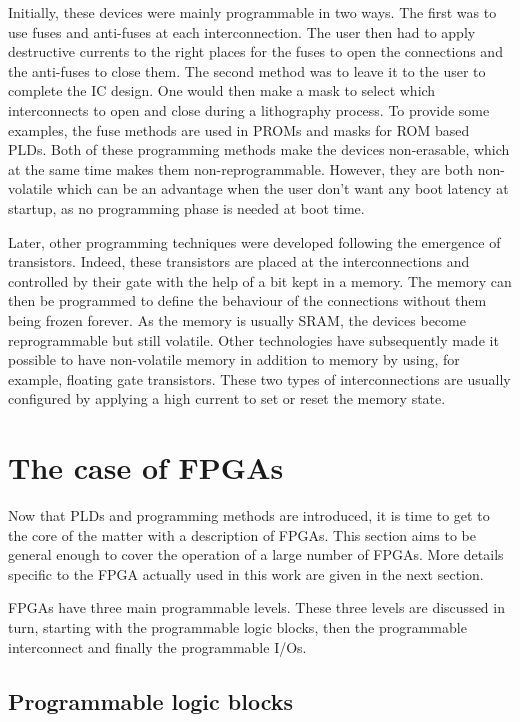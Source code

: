 Initially, these devices were mainly programmable in two ways. The first was to use fuses and 
anti-fuses at each interconnection. The user then had to apply destructive currents to the right 
places for the fuses to open the connections and the anti-fuses to close them. The second method was 
to leave it to the user to complete the IC design. One would then make a mask to select which 
interconnects to open and close during a lithography process. To provide some examples, the fuse 
methods are used in PROMs and 
masks for ROM based PLDs. Both of these programming methods make the devices non-erasable, which at 
the same time makes them non-reprogrammable. However, they are both non-volatile which can be an 
advantage when the user don't want any boot latency at startup, as no programming phase is needed at boot
time.

Later, other programming techniques were developed following the emergence of transistors. Indeed, 
these transistors are placed at the interconnections and controlled by their gate with the help of 
a bit kept in a memory. The memory can then be programmed to define the behaviour of the connections 
without them being frozen forever. As the memory is usually SRAM, the devices become reprogrammable
but still volatile. Other technologies have subsequently made it possible to have non-volatile 
memory in addition to memory by using, for example, floating gate transistors. These two types of 
interconnections are usually configured by applying a high current to set or reset the memory state. 

\section{The case of FPGAs}

Now that PLDs and programming methods are introduced, it is time to get to the 
core of the matter with a description of FPGAs.  This section aims to be general 
enough to cover the operation of a large number of FPGAs. More details specific to the FPGA actually used in this work are given in the next 
section.

FPGAs have three main programmable levels. These 
three levels are discussed in turn, starting with the programmable logic blocks, then the 
programmable interconnect and finally the programmable I/Os. 

\subsection{Programmable logic blocks}

